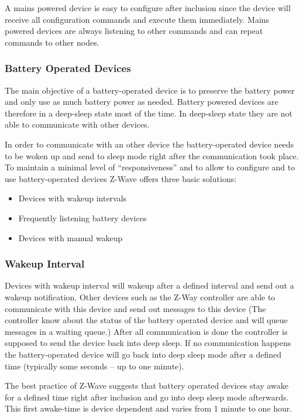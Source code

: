 A mains powered device is easy to configure after inclusion since the device will receive all configuration 
commands and execute them immediately. Mains powered devices are always listening to other commands and can 
repeat commands to other nodes. 

\subsubsection{Battery Operated Devices}

The main objective of a battery-operated device is to preserve the battery power and only use as much 
battery power as needed.  Battery powered devices are therefore in a deep-sleep state most of the time.
 In deep-sleep state they are not able to communicate with other devices. 

In order to communicate with an other device the battery-operated device needs to be woken up and send to 
sleep mode right after the communication took place. To maintain a minimal level of “responsiveness” and 
to allow to configure and to use battery-operated devices Z-Wave offers three basic solutions:
\begin{itemize}
\item Devices with wakeup intervals
\item Frequently listening battery devices 
\item Devices with manual wakeup
\end{itemize}

\subsubsection{Wakeup Interval}

Devices with wakeup interval will wakeup after a defined interval and send out a wakeup notification. 
Other devices such as the Z-Way controller are able to communicate with this device and send out messages 
to this device (The controller know about the status of the battery operated device and will queue messages 
in a waiting queue.) After all communication is done the controller is supposed to send the device back into 
deep sleep.
If no communication happens the battery-operated device will go back into deep sleep mode after a defined 
time (typically some seconds – up to one minute).

The best practice of Z-Wave suggests that battery operated devices stay awake for a defined time right 
after inclusion and go into deep sleep mode afterwards. This first awake-time is device dependent and 
varies from 1 minute to one hour.

